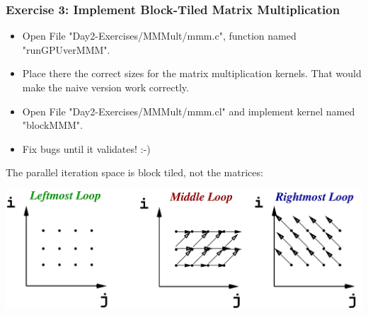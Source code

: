 \documentclass{beamer}
\begin{document}
\begin{frame}[fragile,t]
  \frametitle{Exercise 3: Implement Block-Tiled Matrix Multiplication}

\begin{itemize}
    \item Open File "Day2-Exercises/MMMult/mmm.c", function named "runGPUverMMM".
    \item Place there the correct sizes for the matrix multiplication kernels. That would make the naive version work correctly.
    \item Open File "Day2-Exercises/MMMult/mmm.cl" and implement kernel named "blockMMM".
    \item Fix bugs until it validates! :-)
\end{itemize}

\pause
The parallel iteration space is block tiled, not the matrices:

\hspace{-5ex}\includegraphics[height=20ex]{img/day2/LoopDeps} 


\end{frame}
\end{document}

